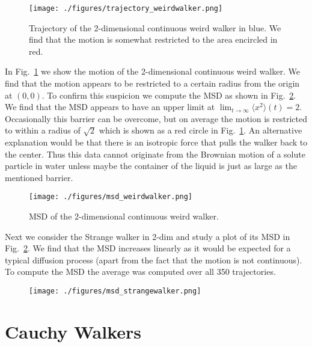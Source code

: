\documentclass[12pt]{article}
\begin{document}
\begin{figure}[H]
  \centering
    \texttt{[image: ./figures/trajectory\_weirdwalker.png]}
    \caption{Trajectory of the 2-dimensional continuous weird walker in blue. We find that the 
            motion is somewhat restricted to the area encircled in red.}
    \label{fig:abb3}
  \end{figure}
In Fig.~\ref{fig:abb3} we show the motion of the 2-dimensional continuous weird walker.
We find that the motion appears to be restricted to a certain radius from the origin at $(0,0)$.
To confirm this suspicion we compute the MSD as shown in Fig.~\ref{fig:abb4}. We find that the 
MSD appears to have an upper limit at $\lim_{t \rightarrow \infty} \langle x^2 \rangle (t) = 2$.
Occasionally this barrier can be overcome, but on average the motion is restricted to within a
radius of $\sqrt{2}$ which is shown as a red circle in Fig.~\ref{fig:abb3}. An alternative explanation would be that
there is an isotropic force that pulls the walker back to the center.
Thus this data cannot originate from the Brownian motion of a solute particle in water unless maybe the container of the liquid is just as large as the mentioned barrier.
 
\begin{figure}[H]
  \centering
    \texttt{[image: ./figures/msd\_weirdwalker.png]}
    \caption{MSD of the 2-dimensional continuous weird walker.}
    \label{fig:abb4}
  \end{figure}
 
 
Next we consider the Strange walker in 2-dim and study a plot of its MSD in Fig.~\ref{fig:abb4}. We find
that the MSD increases linearly as it would be expected for a typical diffusion process (apart from the fact
that the motion is not continuous). To compute the MSD the average was computed over all 350 trajectories.
 
\begin{figure}[H]
  \centering
    \texttt{[image: ./figures/msd\_strangewalker.png]}
    \label{fig:abb5}
  \end{figure}
 
 
\section{Cauchy Walkers}
 
\end{document}
